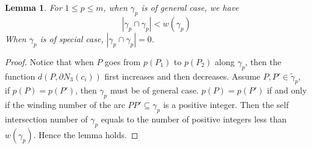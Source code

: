 \documentclass[11pt, a4paper]{article}
\newtheorem{lemma}[thm]{Lemma}
\theoremstyle{definition}
\theoremstyle{remark}
\newcommand{\abs}[1]{\left| #1 \right|}
\begin{document}
\begin{lemma}\label{lemma_31}
For $1\leqslant p\leqslant m$, when $\gamma_p$ is of general case, we have
  $$\abs{\gamma_p\cap\gamma_p}<w(\gamma_p)$$
When $\gamma_p$ is of special case, 
$\abs{\gamma_p\cap\gamma_p}=0$.
\end{lemma}


\begin{proof}


  Notice that when $P$ goes from $p(P_1)$ to $p(P_2)$ along $\gamma_p$, then the function $d(P,\partial N_3(c_i))$ first increases and then decreases. Assume $P,P'\in\widetilde\gamma_p$, if $p(P)=p(P')$, then $\gamma_p$ must be of general case. $p(P)=p(P')$ if and only if the winding number of the arc $PP'\subseteq\gamma_p$ is a positive integer. Then the self intersection number of $\gamma_p$ equals to the number of positive integers less than $w(\gamma_p)$. Hence the lemma holds.
\end{proof}
\end{document}

